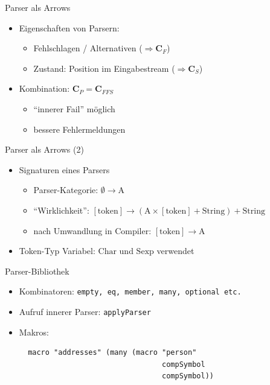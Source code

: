 \documentclass{beamer}
\newcommand{\pfeil}{\item[$\Rightarrow$]}
\newcommand\ato{\rightarrow} %
\begin{document}
\begin{frame}{Parser als Arrows}
  \begin{itemize}
  \item Eigenschaften von Parsern:
    \begin{itemize}
    \item Fehlschlagen / Alternativen ($\Rightarrow \mathbf{C}_F$)
    \item Zustand: Position im Eingabestream ($\Rightarrow \mathbf{C}_S$)
    \end{itemize}
  \item Kombination: $\mathbf{C}_P = \mathbf{C}_{FFS}$
    \begin{itemize}
    \item ``innerer Fail'' möglich
      \pfeil bessere Fehlermeldungen
    \end{itemize}
  \end{itemize}
\end{frame}

\begin{frame}{Parser als Arrows (2)}
  \begin{itemize}
  \item Signaturen eines Parsers
    \begin{itemize}
    \item Parser-Kategorie: $\emptyset \ato \mathrm{A}$
    \item ``Wirklichkeit'': $[\mathrm{token}] \ato (\mathrm{A} \times
      [\mathrm{token}] + \mathrm{String}) + \mathrm{String}$
    \item nach Umwandlung in Compiler: $[\mathrm{token}] \ato \mathrm{A}$
    \end{itemize}  
  \item Token-Typ Variabel: $\mathrm{Char}$ und $\mathrm{Sexp}$
    verwendet
  \end{itemize}
\end{frame}

\begin{frame}[fragile]{Parser-Bibliothek}
  \begin{itemize}
  \item Kombinatoren: \verb+empty, eq, member, many, optional etc.+
  \item Aufruf innerer Parser: \verb+applyParser+
    \pfeil Makros:
\begin{verbatim}
  macro "addresses" (many (macro "person" 
                                 compSymbol 
                                 compSymbol))
\end{verbatim}
  \end{itemize}
\end{frame}
\end{document}
